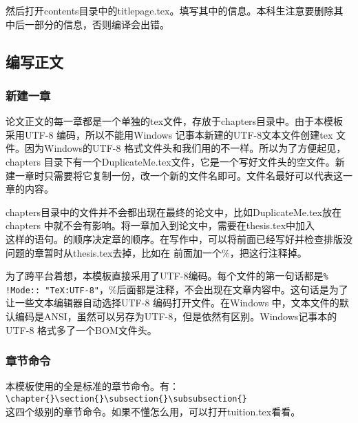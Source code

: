 然后打开contents目录中的titlepage.tex。填写其中的信息。本科生注意要删除其中后一部分的信息，否则编译会出错。
\subsection{编写正文}
\subsubsection{新建一章}
论文正文的每一章都是一个单独的tex文件，存放于chapters目录中。由于本模板采用UTF-8 编码，所以不能用Windows 记事本新建的UTF-8文本文件创建tex 文件。因为Windows的UTF-8 格式文件头和我们用的不一样。所以为了方便起见，chapters 目录下有一个DuplicateMe.tex文件，它是一个写好文件头的空文件。新建一章时只需要将它复制一份，改一个新的文件名即可。文件名最好可以代表这一章的内容。

chapters目录中的文件并不会都出现在最终的论文中，比如DuplicateMe.tex放在chapters 中就不会有影响。将一章加入到论文中，需要在thesis.tex中加入\\
\verb||这样的语句。\verb||的顺序决定章的顺序。在写作中，可以将前面已经写好并检查排版没问题的章暂时从thesis.tex去掉，比如在\verb|| 前面加一个\%，把这行注释掉。

为了跨平台着想，本模板直接采用了UTF-8编码。每个文件的第一句话都是\verb|% !Mode:: "TeX:UTF-8"|，\%后面都是注释，不会出现在文章内容中。这句话是为了让一些文本编辑器自动选择UTF-8 编码打开文件。在Windows 中，文本文件的默认编码是ANSI，虽然可以另存为UTF-8，但是依然有区别。Windows记事本的UTF-8 格式多了一个BOM文件头。

\subsubsection{章节命令}
本模板使用的全是标准的章节命令。有：\\
\verb|\chapter{}\section{}\subsection{}\subsubsection{}|\\
这四个级别的章节命令。如果不懂怎么用，可以打开tuition.tex看看。

